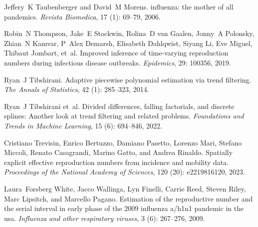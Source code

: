 \documentclass[10pt,letterpaper]{article}
\begin{document}
\begin{thebibliography}{32}
  Jeffery~K Taubenberger and David~M Morens.
   influenza: the mother of all pandemics.
  \newblock \emph{Revista Biomedica}, 17 (1): 69--79, 2006.
  
  Robin~N Thompson, Jake~E Stockwin, Rolina~D van Gaalen, Jonny~A Polonsky,
    Zhian~N Kamvar, P~Alex Demarsh, Elisabeth Dahlqwist, Siyang Li, Eve Miguel,
    Thibaut Jombart, et~al.
  \newblock Improved inference of time-varying reproduction numbers during
    infectious disease outbreaks.
  \newblock \emph{Epidemics}, 29: 100356, 2019.
  
  Ryan~J Tibshirani.
  \newblock Adaptive piecewise polynomial estimation via trend filtering.
  \newblock \emph{The Annals of Statistics}, 42 (1): 285--323,
    2014.
  
  Ryan~J Tibshirani et~al.
  \newblock Divided differences, falling factorials, and discrete splines:
    Another look at trend filtering and related problems.
  \newblock \emph{Foundations and Trends{\textregistered} in Machine Learning},
    15 (6): 694--846, 2022.
  
  Cristiano Trevisin, Enrico Bertuzzo, Damiano Pasetto, Lorenzo Mari, Stefano
    Miccoli, Renato Casagrandi, Marino Gatto, and Andrea Rinaldo.
  \newblock Spatially explicit effective reproduction numbers from incidence and
    mobility data.
  \newblock \emph{Proceedings of the National Academy of Sciences}, 120
    (20): e2219816120, 2023.
  
  Laura~Forsberg White, Jacco Wallinga, Lyn Finelli, Carrie Reed, Steven Riley,
    Marc Lipsitch, and Marcello Pagano.
  \newblock Estimation of the reproductive number and the serial interval in
    early phase of the 2009 influenza a/h1n1 pandemic in the usa.
  \newblock \emph{Influenza and other respiratory viruses}, 3
    (6): 267--276, 2009.
  
  \end{thebibliography}

  
%
\end{document}

